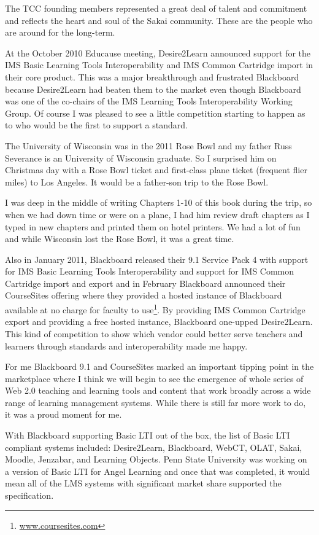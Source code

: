 \documentclass[12pt]{book}
\begin{document}
The TCC founding members represented a great deal of
talent and commitment and reflects the heart and soul
of the Sakai community.  These are the people who are around
for the long-term.

At the October 2010 Educause meeting, Desire2Learn announced support
for the IMS Basic Learning Tools Interoperability and IMS
Common Cartridge import in their core product.  This was a major
breakthrough and frustrated Blackboard because Desire2Learn had beaten
them to the market even though Blackboard was one of the co-chairs
of the IMS Learning Tools Interoperability Working Group.   Of course
I was pleased to see a little competition starting to happen as to
who would be the first to support a standard.

The University of Wisconsin was in the 2011 Rose Bowl and my father
Russ Severance is an University of Wisconsin graduate.  So I
surprised him on Christmas day with a Rose Bowl ticket and
first-class plane ticket (frequent flier miles) to Los
Angeles.  It would be a father-son trip to the Rose Bowl.

I was deep in the middle of writing Chapters 1-10 of this
book during the trip, so when we had down time or were on a plane,
I had him review draft chapters as I typed in
new chapters and printed them on hotel printers.  We had a lot of fun
and while Wisconsin lost the Rose Bowl, it was a great time.

Also in January 2011, Blackboard released their 9.1 Service Pack 4 with
support for IMS Basic Learning Tools Interoperability and support
for IMS Common Cartridge import and export and in February Blackboard
announced their CourseSites offering
where they provided a hosted
instance of Blackboard available at no charge for
faculty to use\footnote{\url{www.coursesites.com}}.
By providing IMS Common Cartridge export and providing a free
hosted instance, Blackboard one-upped Desire2Learn.   This kind
of competition to show which vendor could better serve
teachers and learners through standards and interoperability made me happy.

For me Blackboard 9.1 and CourseSites marked an important tipping point
in the marketplace where I think we will begin to see the emergence of
whole series of Web 2.0 teaching and learning tools and content
that work broadly across a wide range of learning management systems.
While there is still far more work to do, it was a proud moment for me.

With Blackboard supporting Basic LTI out of the box, the list of Basic LTI
compliant systems included: Desire2Learn, Blackboard, WebCT, OLAT,
Sakai, Moodle, Jenzabar, and Learning Objects.  Penn State University was working on a
version of Basic LTI for Angel Learning and once that was completed, it would mean all of the
LMS systems with significant market share supported the specification.
\end{document}

